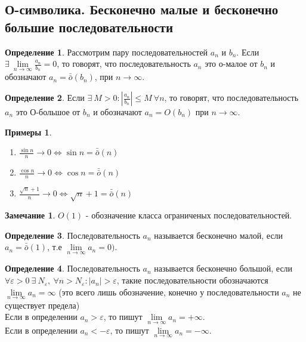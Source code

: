 \documentclass[a4paper, 12pt]{article}
\renewcommand{\epsilon}{\varepsilon}
\newcommand\tab[1][.5cm]{\hspace*{#1}}
\newcommand{\lims}{\lim\limits_{n\to \infty}}
\newcommand{\om}{\bar{\bar{o}}}
\theoremstyle{definition}
\newtheorem*{definition}{Определение}
\newtheorem*{comm}{Замечание}
\newtheorem*{examples}{Примеры}
\begin{document}
        \subsection{О-символика. Бесконечно малые и бесконечно большие последовательности}
        \begin{definition}
            Рассмотрим пару последовательностей $a_n$ и $b_n$. Если\\ $\exists\ \lims \frac{a_n}{b_n}=0$, то говорят, что последовательность $a_n$ это о-малое от $b_n$ и обозначают $a_n=\om(b_n)$, при $n\to \infty$. 
        \end{definition} 
        \begin{definition}
            Если $\exists\ M>0: |\frac{a_n}{b_n}|\leq M\ \forall n$, то говорят, что последовательность $a_n$ это О-большое от $b_n$ и обозначают $a_n=O(b_n)$ при $n\to \infty$.
        \end{definition} 
        \begin{examples}\tab
            \begin{enumerate}
                \item $\frac{\sin n}{n}\to 0 \Leftrightarrow \sin n = \om(n)$
                \item $\frac{\cos n}{n}\to 0 \Leftrightarrow \cos n = \om(n)$
                \item $\frac{\sqrt{n}+1}{n}\to 0 \Leftrightarrow \sqrt{n}+1 = \om(n)$
            \end{enumerate}
        \end{examples}
        \begin{comm}
            $O(1)$ - обозначение класса ограниченых последовательностей.
        \end{comm} 
        \begin{definition}
            Последовательность $a_n$ называется бесконечно малой, если\\ $a_n=\om(1)$, т.е $\lims a_n=0)$.
        \end{definition} 
        \begin{definition}
            Последовательность $a_n$ называется бесконечно большой, если\\ $\forall \epsilon>0\ \exists\ N_{\epsilon},\ \forall n>N_{\epsilon}: |a_n|>\epsilon$, такие последовательности обозначаются $\lims a_n=\infty$ (это всего лишь обозначение, конечно у последовательности $a_n$ не существует предела)\\
            Если в определении $a_n>\epsilon$, то пишут $\lims a_n=+\infty$.\\
            Если в определении $a_n<-\epsilon$, то пишут $\lims a_n=-\infty$.
        \end{definition} 
\end{document}
